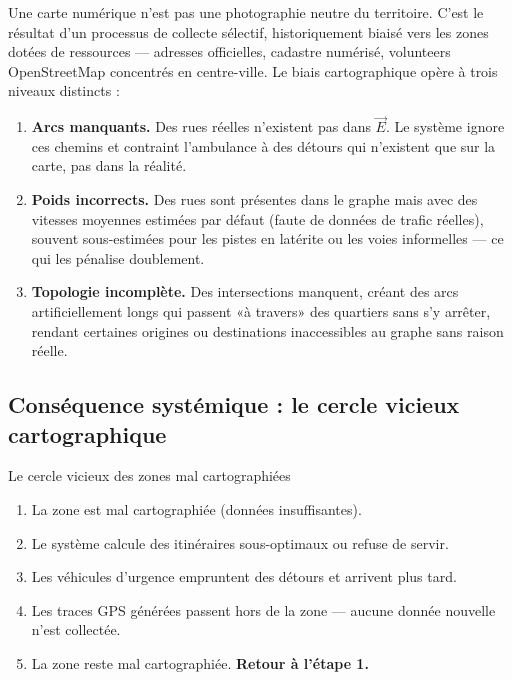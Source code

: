 \documentclass[12pt,a4paper]{article}
\theoremstyle{definition}
\theoremstyle{remark}
\begin{document}
Une carte numérique n'est pas une photographie neutre du territoire.
C'est le résultat d'un processus de collecte sélectif, historiquement
biaisé vers les zones dotées de ressources --- adresses officielles,
cadastre numérisé, volunteers OpenStreetMap concentrés en centre-ville.
Le biais cartographique opère à trois niveaux distincts :

\begin{enumerate}[leftmargin=2em, itemsep=6pt]
  \item \textbf{Arcs manquants.} Des rues réelles n'existent pas dans
    $\vec{E}$. Le système ignore ces chemins et contraint l'ambulance
    à des détours qui n'existent que sur la carte, pas dans la réalité.

  \item \textbf{Poids incorrects.} Des rues sont présentes dans le
    graphe mais avec des vitesses moyennes estimées par défaut
    (faute de données de trafic réelles), souvent sous-estimées
    pour les pistes en latérite ou les voies informelles --- ce qui
    les pénalise doublement.

  \item \textbf{Topologie incomplète.} Des intersections manquent,
    créant des arcs artificiellement longs qui passent «à travers»
    des quartiers sans s'y arrêter, rendant certaines origines ou
    destinations inaccessibles au graphe sans raison réelle.
\end{enumerate}

\subsection{Conséquence systémique : le cercle vicieux cartographique}

\begin{equitebox}{Le cercle vicieux des zones mal cartographiées}
\begin{enumerate}[leftmargin=1.5em, itemsep=4pt]
  \item La zone est mal cartographiée (données insuffisantes).
  \item Le système calcule des itinéraires sous-optimaux ou refuse de servir.
  \item Les véhicules d'urgence empruntent des détours et arrivent plus tard.
  \item Les traces GPS générées passent hors de la zone --- aucune donnée nouvelle n'est collectée.
  \item La zone reste mal cartographiée. \textbf{Retour à l'étape 1.}
\end{enumerate}
\end{equitebox}
\end{document}
